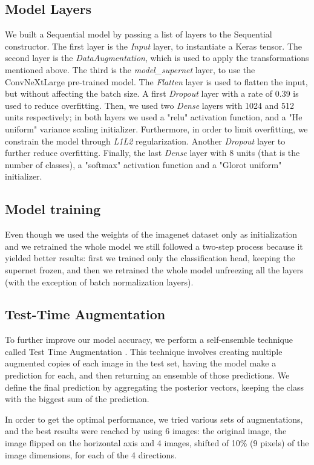 \subsection{Model Layers}
We built a Sequential model by passing a list of layers to the Sequential constructor. The first layer is the \textit{Input} layer, to instantiate a Keras tensor. The second layer is the \textit{DataAugmentation}, which is used to apply the transformations mentioned above. The third is the \textit{model\_supernet} layer, to use the ConvNeXtLarge pre-trained model. The \textit{Flatten} layer is used to flatten the input, but without affecting the batch size. A first \textit{Dropout} layer with a rate of 0.39 is used to reduce overfitting. Then, we used two \textit{Dense} layers with 1024 and 512 units respectively; in both layers we used a "relu" activation function, and a "He uniform" variance scaling initializer. Furthermore, in order to limit overfitting, we constrain the model through \textit{L1L2} regularization. Another \textit{Dropout} layer to further reduce overfitting. Finally, the last \textit{Dense} layer with 8 units (that is the number of classes), a "softmax" activation function and a "Glorot uniform" initializer.

\subsection{Model training}
Even though we used the weights of the imagenet dataset only as initialization and we retrained the whole model we still followed a two-step process because it yielded better results: first we trained only the classification head, keeping the supernet frozen, and then we retrained the whole model unfreezing all the layers (with the exception of batch normalization layers).

\subsection{Test-Time Augmentation}
\label{TestTimeAug}
To further improve our model accuracy, we perform a self-ensemble technique called Test Time Augmentation \cite{tta}. This technique involves creating multiple augmented copies of each image in the test set, having the model make a prediction for each, and then returning an ensemble of those predictions.
We define the final prediction by aggregating the posterior vectors, keeping the class with the biggest sum of the prediction.

In order to get the optimal performance, we tried various sets of augmentations, and the best results were reached by using 6 images: the original image, the image flipped on the horizontal axis and 4 images, shifted of 10\% (9 pixels) of the image dimensions, for each of the 4 directions.